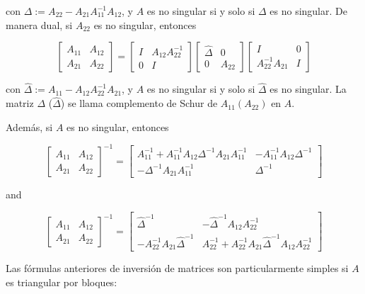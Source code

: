 \documentclass[11pt]{article}
\begin{document}
con $\Delta:=A_{22}-A_{21} A_{11}^{-1} A_{12}$, y $A$ es no singular si y solo si $\Delta$ es no singular. De manera dual, si $A_{22}$ es no singular, entonces

$$
\left[\begin{array}{ll}
A_{11} & A_{12} \\
A_{21} & A_{22}
\end{array}\right]=\left[\begin{array}{cc}
I & A_{12} A_{22}^{-1} \\
0 & I
\end{array}\right]\left[\begin{array}{cc}
\hat{\Delta} & 0 \\
0 & A_{22}
\end{array}\right]\left[\begin{array}{cc}
I & 0 \\
A_{22}^{-1} A_{21} & I
\end{array}\right]
$$

con $\hat{\Delta}:=A_{11}-A_{12} A_{22}^{-1} A_{21}$, y $A$ es no singular si y solo si $\hat{\Delta}$ es no singular. La matriz $\Delta$ ($\hat{\Delta}$) se llama complemento de Schur de $A_{11}\left(A_{22}\right)$ en $A$.

Además, si $A$ es no singular, entonces

$$
\left[\begin{array}{ll}
A_{11} & A_{12} \\
A_{21} & A_{22}
\end{array}\right]^{-1}=\left[\begin{array}{cc}
A_{11}^{-1}+A_{11}^{-1} A_{12} \Delta^{-1} A_{21} A_{11}^{-1} & -A_{11}^{-1} A_{12} \Delta^{-1} \\
-\Delta^{-1} A_{21} A_{11}^{-1} & \Delta^{-1}
\end{array}\right]
$$

and

$$
\left[\begin{array}{ll}
A_{11} & A_{12} \\
A_{21} & A_{22}
\end{array}\right]^{-1}=\left[\begin{array}{cc}
\hat{\Delta}^{-1} & -\hat{\Delta}^{-1} A_{12} A_{22}^{-1} \\
-A_{22}^{-1} A_{21} \hat{\Delta}^{-1} & A_{22}^{-1}+A_{22}^{-1} A_{21} \hat{\Delta}^{-1} A_{12} A_{22}^{-1}
\end{array}\right]
$$

Las fórmulas anteriores de inversión de matrices son particularmente simples si $A$ es triangular por bloques:
\end{document}
